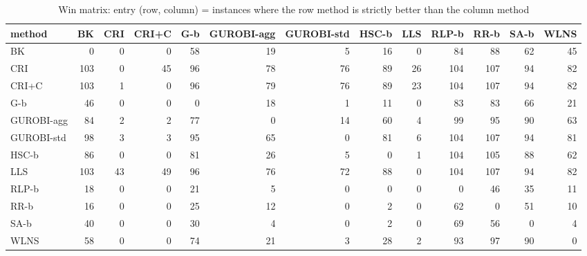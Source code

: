 \begin{table}[htbp]
\centering
\small
\caption{Win matrix: entry (row, column) = instances where the row method is strictly better than the column method}
\label{tab:E4a_equal_budgets_b10_wins}
\begin{tabular}{lrrrrrrrrrrrr}
\toprule
method & BK & CRI & CRI+C & G-b & GUROBI-agg & GUROBI-std & HSC-b & LLS & RLP-b & RR-b & SA-b & WLNS \\
\midrule
BK & 0 & 0 & 0 & 58 & 19 & 5 & 16 & 0 & 84 & 88 & 62 & 45 \\
CRI & 103 & 0 & 45 & 96 & 78 & 76 & 89 & 26 & 104 & 107 & 94 & 82 \\
CRI+C & 103 & 1 & 0 & 96 & 79 & 76 & 89 & 23 & 104 & 107 & 94 & 82 \\
G-b & 46 & 0 & 0 & 0 & 18 & 1 & 11 & 0 & 83 & 83 & 66 & 21 \\
GUROBI-agg & 84 & 2 & 2 & 77 & 0 & 14 & 60 & 4 & 99 & 95 & 90 & 63 \\
GUROBI-std & 98 & 3 & 3 & 95 & 65 & 0 & 81 & 6 & 104 & 107 & 94 & 81 \\
HSC-b & 86 & 0 & 0 & 81 & 26 & 5 & 0 & 1 & 104 & 105 & 88 & 62 \\
LLS & 103 & 43 & 49 & 96 & 76 & 72 & 88 & 0 & 104 & 107 & 94 & 82 \\
RLP-b & 18 & 0 & 0 & 21 & 5 & 0 & 0 & 0 & 0 & 46 & 35 & 11 \\
RR-b & 16 & 0 & 0 & 25 & 12 & 0 & 2 & 0 & 62 & 0 & 51 & 10 \\
SA-b & 40 & 0 & 0 & 30 & 4 & 0 & 2 & 0 & 69 & 56 & 0 & 4 \\
WLNS & 58 & 0 & 0 & 74 & 21 & 3 & 28 & 2 & 93 & 97 & 90 & 0 \\
\bottomrule
\end{tabular}
\end{table}

